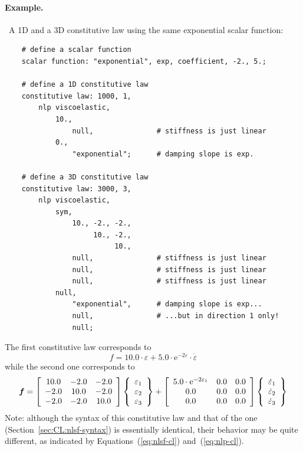 \paragraph{Example.} \
A 1D and a 3D constitutive law using the same exponential scalar function:
\begin{verbatim}
    # define a scalar function
    scalar function: "exponential", exp, coefficient, -2., 5.;

    # define a 1D constitutive law
    constitutive law: 1000, 1,
        nlp viscoelastic,
            10.,
                null,               # stiffness is just linear
            0.,
                "exponential";      # damping slope is exp.

    # define a 3D constitutive law
    constitutive law: 3000, 3,
        nlp viscoelastic,
            sym,
                10., -2., -2.,
                     10., -2.,
                          10.,
                null,               # stiffness is just linear
                null,               # stiffness is just linear
                null,               # stiffness is just linear
            null,
                "exponential",      # damping slope is exp...
                null,               # ...but in direction 1 only!
                null;
\end{verbatim}
The first constitutive law corresponds to
\begin{equation}
        f = 10.0 \cdot \varepsilon
        + 5.0 \cdot \mathrm{e}^{-2 \varepsilon} \cdot \dot{\varepsilon}
\end{equation}
while the second one corresponds to
\begin{equation}
        \T{f} = \sqbr{\matr{ccc}{
                10.0 & -2.0 & -2.0 \\
                -2.0 & 10.0 & -2.0 \\
                -2.0 & -2.0 & 10.0
        }} \cubr{\cvvect{
                \varepsilon_1 \\
                \varepsilon_2 \\
                \varepsilon_3
        }} + \sqbr{\matr{ccc}{
                5.0 \cdot \mathrm{e}^{-2 \varepsilon_1} & 0.0 & 0.0 \\
                0.0 & 0.0 & 0.0 \\
                0.0 & 0.0 & 0.0
        }} \cubr{\cvvect{
                \dot{\varepsilon}_1 \\
                \dot{\varepsilon}_2 \\
                \dot{\varepsilon}_3
        }}
\end{equation}
Note: although the syntax of this constitutive law
and that of the  one
(Section~\ref{sec:CL:nlsf-syntax})
is essentially identical, their behavior may be quite different,
as indicated by Equations~(\ref{eq:nlsf-cl}) and~(\ref{eq:nlp-cl}).

